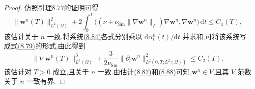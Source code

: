 \begin{lemma}[有限维空间中问题解的存在唯一性]
\begin{proof}
仿照引理\hyperref[lem:smagorinsky-l3-stability]{8.77}的证明可得
\begin{equation}\label{eq:smagorinsky-galerkin-energy-estimate}
 \|\bm{w}^n(T)\|_{L^2(\Omega)}^2
 +2\int_0^T
  \bigl((\nu+\nu_{\mathrm{Sm}}\|\nabla\bm{w}^n\|_F)
         \nabla\bm{w}^n,\nabla\bm{w}^n\bigr)\,\mathrm{d}t
 \le C_1(T),
\end{equation}
该估计关于 $n$ 一致.将系统\hyperref[eq:smagorinsky-galerkin-system]{(8.84)}各式分别乘以 $\mathrm{d}\alpha_l^n(t)/\mathrm{d}t$ 并求和,可将该系统写成式\hyperref[eq:smagorinsky-time-derivative-identity]{(8.79)}的形式,由此得到
\begin{equation}\label{eq:smagorinsky-galerkin-h1-estimate}
 \|\nabla\bm{w}^n(T)\|_{L^3(\Omega)}^3
 +\frac{3}{2\nu_{\mathrm{Sm}}}
       \|\partial_t\bm{w}^n\|_{L^2(0,T;L^2(\Omega))}^2
 \le C_2(T).
\end{equation}
该估计对 $T>0$ 成立,且关于 $n$ 一致.由估计\hyperref[eq:smagorinsky-galerkin-energy-estimate]{(8.87)}和\hyperref[eq:smagorinsky-galerkin-h1-estimate]{(8.88)}可知,$\bm{w}^n\in V$,且其 $V$ 范数关于 $n$ 一致有界.
\end{proof}

\end{lemma}
